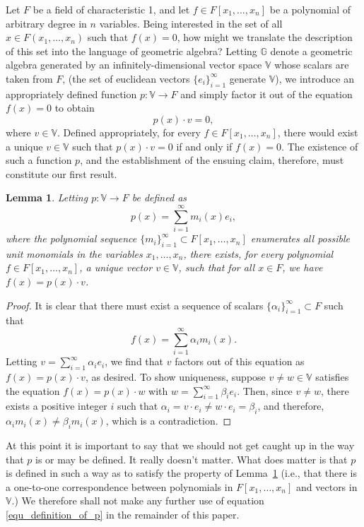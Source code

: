 \documentclass{birkjour}
\newtheorem{lem}[thm]{Lemma}
\theoremstyle{definition}
\theoremstyle{remark}
\numberwithin{equation}{section}
\newcommand{\G}{\mathbb{G}}
\newcommand{\V}{\mathbb{V}}
\begin{document}
Let $F$ be a field of characteristic 1, and let $f\in F[x_1,\dots,x_n]$ be a polynomial of
arbitrary degree in $n$ variables.  Being interested in the set of all $x\in F(x_1,\dots,x_n)$ such that
$f(x)=0$, how might we translate the description of this set into the language of geometric algebra?
Letting $\G$ denote a geometric algebra generated by an infinitely-dimensional vector space $\V$ whose
scalars are taken from $F$, (the set of euclidean vectors $\{e_i\}_{i=1}^\infty$ generate $\V$),
we introduce an appropriately defined function $p:\V\to F$ and
simply factor it out of the equation $f(x)=0$ to obtain
\begin{equation*}
p(x)\cdot v = 0,
\end{equation*}
where $v\in\V$.  Defined appropriately, for every $f\in F[x_1,\dots,x_n]$, there would
exist a unique $v\in\V$ such that $p(x)\cdot v=0$ if and only if $f(x)=0$.  The existence
of such a function $p$, and the establishment of the ensuing claim, therefore, must constitute our first result.
\begin{lem}\label{lem_vector_polynomial_correspondence}
Letting $p:\V\to F$ be defined as
\begin{equation}\label{equ_definition_of_p}
p(x)=\sum_{i=1}^\infty m_i(x)e_i,
\end{equation}
where the polynomial sequence $\{m_i\}_{i=1}^\infty\subset F[x_1,\dots,x_n]$ enumerates all possible unit monomials
in the variables $x_1,\dots,x_n$, there exists, for every polynomial $f\in F[x_1,\dots,x_n]$,
a unique vector $v\in\V$, such that for all $x\in F$, we have $f(x)=p(x)\cdot v$.
\end{lem}
\begin{proof}
It is clear that there must exist a sequence of scalars $\{\alpha_i\}_{i=1}^\infty\subset F$
such that
\begin{equation*}
f(x)=\sum_{i=1}^\infty \alpha_i m_i(x).
\end{equation*}
Letting $v=\sum_{i=1}^\infty \alpha_i e_i$, we find that $v$ factors out of this
equation as $f(x)=p(x)\cdot v$, as desired.  To show uniqueness, suppose $v\neq w\in\V$
satisfies the equation $f(x)=p(x)\cdot w$ with $w=\sum_{i=1}^\infty\beta_i e_i$.
Then, since $v\neq w$, there exists a positive integer $i$ such that $\alpha_i=v\cdot e_i\neq w\cdot e_i=\beta_i$,
and therefore, $\alpha_i m_i(x)\neq \beta_i m_i(x)$, which is a contradiction.

\end{proof}
At this point it is important to say that we should not get caught up in the way that $p$
is or may be defined.  It really doesn't matter.  What does matter is that $p$ is defined in such
a way as to satisfy the property of Lemma~\ref{lem_vector_polynomial_correspondence} (i.e., that
there is a one-to-one correspondence between polynomials in $F[x_1,\dots,x_n]$ and vectors in $\V$.)
We therefore shall not make any further use of equation \eqref{equ_definition_of_p} in the remainder of this paper.
\end{document}

